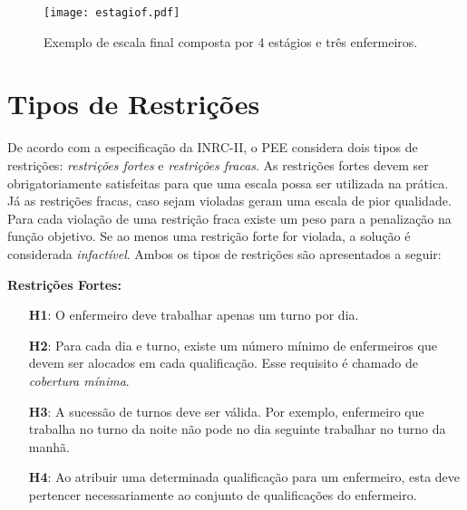\documentclass[cic,tc, twoside]{iiufrgs}
\begin{document}
\begin{figure}[ht!]
\texttt{[image: estagiof.pdf]}
\centering
\caption{Exemplo de escala final composta por 4 estágios e três enfermeiros.}
\label{fig:escalaf}
\end{figure}


\newpage

\section{Tipos de Restrições} \label{sec:restricoes}

De acordo com a especificação da INRC-II, o PEE considera dois tipos de restrições: \emph{restrições fortes} e \emph{restrições fracas}. As restrições fortes devem ser obrigatoriamente satisfeitas para que uma escala possa ser utilizada na prática. Já as restrições fracas, caso sejam violadas geram uma escala de pior qualidade. Para cada violação de uma restrição fraca existe um peso para a penalização na função objetivo.
Se ao menos uma restrição forte for violada, a solução é considerada \emph{infactível}. Ambos os tipos de restrições são apresentados a seguir: 

\bigskip
\noindent\textbf{Restrições Fortes:}
\begin{itemize}
    \item [\textbf{H1}:] O enfermeiro deve trabalhar apenas um turno por dia.
    \item [\textbf{H2}:] Para cada dia e turno, existe um número mínimo de enfermeiros que devem ser alocados em cada qualificação. Esse requisito é chamado de \textit{cobertura mínima}.
    \item [\textbf{H3}:] A sucessão de turnos deve ser válida. Por exemplo, enfermeiro que trabalha no turno da noite não pode no dia seguinte trabalhar no turno da manhã.
    \item [\textbf{H4}:] Ao atribuir uma determinada qualificação para um enfermeiro, esta deve pertencer necessariamente ao conjunto de qualificações do enfermeiro.
\end{itemize}
\end{document}
